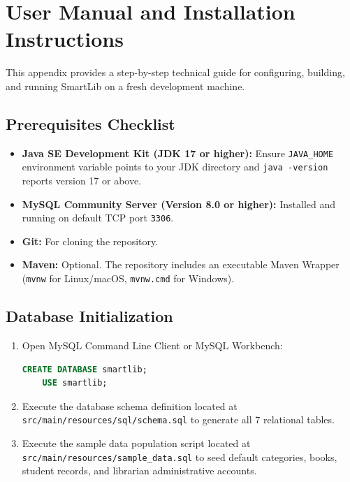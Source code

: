 \appendix
\chapter{User Manual and Installation Instructions}

This appendix provides a step-by-step technical guide for configuring, building, and running SmartLib on a fresh development machine.

\section{Prerequisites Checklist}
\begin{itemize}
    \item \textbf{Java SE Development Kit (JDK 17 or higher):} Ensure \texttt{JAVA\_HOME} environment variable points to your JDK directory and \texttt{java -version} reports version 17 or above.
    \item \textbf{MySQL Community Server (Version 8.0 or higher):} Installed and running on default TCP port \texttt{3306}.
    \item \textbf{Git:} For cloning the repository.
    \item \textbf{Maven:} Optional. The repository includes an executable Maven Wrapper (\texttt{mvnw} for Linux/macOS, \texttt{mvnw.cmd} for Windows).
\end{itemize}

\section{Database Initialization}
\begin{enumerate}
    \item Open MySQL Command Line Client or MySQL Workbench:
    \begin{lstlisting}[language=SQL]
    CREATE DATABASE smartlib;
    USE smartlib;
    \end{lstlisting}
    \item Execute the database schema definition located at \texttt{src/main/resources/sql/schema.sql} to generate all 7 relational tables.
    \item Execute the sample data population script located at \texttt{src/main/resources/sample\_data.sql} to seed default categories, books, student records, and librarian administrative accounts.
\end{enumerate}

